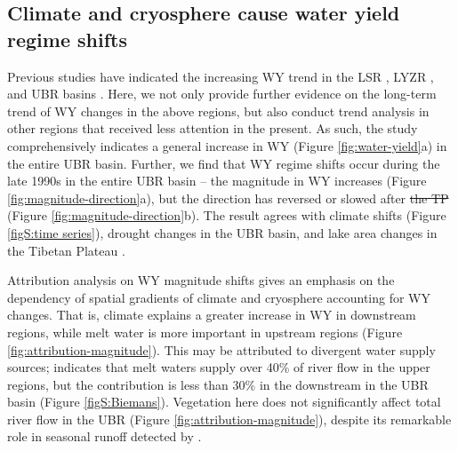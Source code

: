 \documentclass[hess, manuscript]{copernicus}
\providecommand{\DIFaddtex}[1]{{\protect\color{blue}\uwave{#1}}} %
\providecommand{\DIFdeltex}[1]{{\protect\color{red}\sout{#1}}}                      %
\providecommand{\DIFaddbegin}{} %
\providecommand{\DIFaddend}{} %
\providecommand{\DIFdelbegin}{} %
\providecommand{\DIFdelend}{} %
\providecommand{\DIFadd}[1]{\texorpdfstring{\DIFaddtex{#1}}{#1}} %
\providecommand{\DIFdel}[1]{\texorpdfstring{\DIFdeltex{#1}}{}} %
\begin{document}
\subsection{Climate and cryosphere cause water yield regime shifts}
Previous studies have indicated the increasing WY trend in the LSR \citep{linhess2020}, LYZR \citep{zhangech2011}, and UBR basins \citep{li2021vegetation}. Here, we not only provide further evidence on the long-term trend of WY changes in the above regions, but also conduct trend analysis in other regions that received less attention in the present. As such, the study comprehensively indicates a general increase in WY (Figure \ref{fig:water-yield}a) in the entire UBR basin. Further, we find that WY regime shifts occur during the late 1990s in the entire UBR basin -- the magnitude in WY increases (Figure \ref{fig:magnitude-direction}a), but the direction has reversed or slowed after \DIFdelbegin \DIFdel{the TP }\DIFdelend \DIFaddbegin \DIFadd{Tp }\DIFaddend (Figure \ref{fig:magnitude-direction}b). The result agrees with climate shifts (Figure \ref{figS:time series}), drought changes \citep{li2019spatiotemporal} in the UBR basin, and lake area changes in the Tibetan Plateau \citep{zhang2017}.

Attribution analysis on WY magnitude shifts gives an emphasis on the dependency of spatial gradients of climate and cryosphere accounting for WY changes. That is, climate explains a greater increase in WY in downstream regions, while melt water is more important in upstream regions (Figure \ref{fig:attribution-magnitude}). 
This may be attributed to divergent water supply sources; \citet{biemans2019importance} indicates that melt waters supply over 40\% of river flow in the upper regions, but the contribution is less than 30\% in the downstream in the UBR basin (Figure \ref{figS:Biemans}). Vegetation here does not significantly affect total river flow in the UBR (Figure \ref{fig:attribution-magnitude}), despite its remarkable role in seasonal runoff detected by \citet{li2021vegetation}. 
\end{document}
